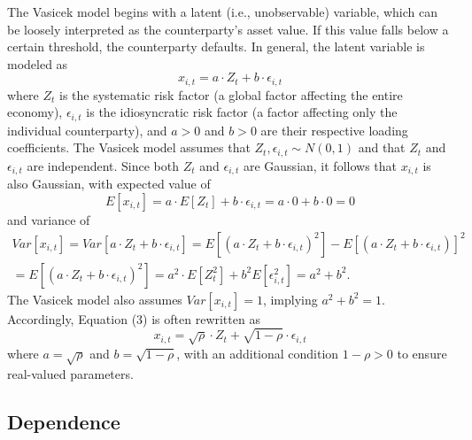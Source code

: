 \documentclass[11pt,a4paper]{article}
\begin{document}
The Vasicek model begins with a latent (i.e., unobservable) variable, which can be loosely interpreted as the counterparty’s asset value. If this value falls below a certain threshold, the counterparty defaults. In general, the latent variable is modeled as
\begin{equation}
x_{i,t} = a \cdot Z_t + b \cdot \epsilon_{i, t}
\end{equation}
where $Z_t$ is the systematic risk factor (a global factor affecting the entire economy), $\epsilon_{i, t}$ is the idiosyncratic risk factor (a factor affecting only the individual counterparty), and $a > 0$ and $b > 0$ are their respective loading coefficients. The Vasicek model assumes that $Z_t, \epsilon_{i, t} \sim N(0, 1)$ and that $Z_t$ and $\epsilon_{i, t}$ are independent. Since both $Z_t$ and $\epsilon_{i, t}$ are Gaussian, it follows that $x_{i, t}$ is also Gaussian, with expected value of
\begin{equation}
E[x_{i, t}] = a \cdot E[Z_t] + b \cdot \epsilon_{i, t} = a \cdot 0 + b \cdot 0 = 0
\end{equation}
and variance of
\begin{multline}
Var[x_{i, t}] = Var[a \cdot Z_t + b \cdot \epsilon_{i, t}] = E[(a \cdot Z_t + b \cdot \epsilon_{i, t})^2] - E[(a \cdot Z_t + b \cdot \epsilon_{i, t})]^2\\ = E[(a \cdot Z_t + b \cdot \epsilon_{i, t})^2] = a^2 \cdot E[Z_t^2] + b^2 E[\epsilon_{i, t}^2] = a^2 + b^2.
\end{multline}
The Vasicek model also assumes $Var[x_{i, t}] = 1$, implying $a^2 + b^2 = 1$. Accordingly, Equation (3) is often rewritten as
\begin{equation}
x_{i ,t} = \sqrt{\rho} \cdot Z_t + \sqrt{1 - \rho} \cdot \epsilon_{i, t}
\end{equation}
where $a = \sqrt{\rho}$ and $b = \sqrt{1 - \rho}$, with an additional condition $1 - \rho > 0$ to ensure real-valued parameters.

\subsection{Dependence}
\end{document}
